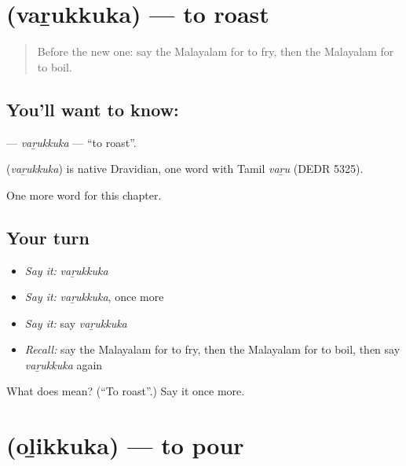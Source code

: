 \section[\texorpdfstring{\ml{വറുക്കുക} (vaṟukkuka)}{വറുക്കുക (vaṟukkuka)}]{ (vaṟukkuka) — to roast}

\label{lesson:ML-C182-varukkuka}



\begin{quote}
Before the new one: say the Malayalam for to fry, then the Malayalam for to boil.
\end{quote}

\subsection*{You'll want to know: }
\textbf{} — \emph{vaṟukkuka} — \textquotedblleft{}to roast\textquotedblright{}.

\begin{cousinweb}
\textbf{} (\emph{vaṟukkuka}) is native Dravidian, one word with Tamil \emph{vaṟu} (DEDR 5325).
\end{cousinweb}

\begin{grammarlens}[title={What you've built}]
One more word for this chapter.
\end{grammarlens}

\subsection*{Your turn}
\begin{itemize}
\raggedright
  \item \emph{Say it:} \emph{vaṟukkuka}
  \item \emph{Say it:} \emph{vaṟukkuka}, once more
  \item \emph{Say it:} say \emph{vaṟukkuka}
  \item \emph{Recall:} say the Malayalam for to fry, then the Malayalam for to boil, then say \emph{vaṟukkuka} again
\end{itemize}

\begin{tcolorbox}[breakable,colback=teal!4,colframe=teal!35!black,title={Before you move on}]
What does  mean? (\textquotedblleft{}To roast\textquotedblright{}.) Say it once more.
\end{tcolorbox}
\section[\texorpdfstring{\ml{ഒഴിക്കുക} (oḻikkuka)}{ഒഴിക്കുക (oḻikkuka)}]{ (oḻikkuka) — to pour}

